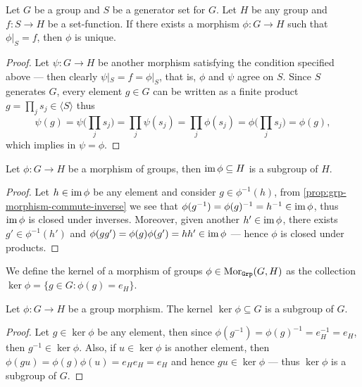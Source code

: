 \begin{proposition}
\label{prop:generator-unique-extension}
Let \(G\) be a group and \(S\) be a generator set for \(G\). Let \(H\) be any
group and \(f: S \to H\) be a set-function. If there exists a morphism \(\phi: G
\to H\) such that \(\phi|_S = f\), then \(\phi\) is unique.
\end{proposition}

\begin{proof}
Let \(\psi: G \to H\) be another morphism satisfying the condition specified
above --- then clearly \(\psi|_S = f = \phi|_{S}\), that is, \(\phi\) and
\(\psi\) agree on \(S\). Since \(S\) generates \(G\), every element \(g \in G\)
can be written as a finite product \(g = \prod_{j} s_j \in \langle S \rangle\)
thus
\[
  \psi(g) = \psi\Big( \prod_j s_j \Big)
  = \prod_j \psi(s_j) = \prod_j \phi(s_j)
  = \phi\Big( \prod_j s_j \Big) = \phi(g),
\]
which implies in \(\psi = \phi\).
\end{proof}

\begin{proposition}
\label{prop:morphism-image-subgroup}
Let \(\phi: G \to H\) be a morphism of groups, then \(\operatorname{im} \phi \subseteq H\) is
a subgroup of \(H\).
\end{proposition}

\begin{proof}
Let \(h \in \operatorname{im} \phi\) be any element and consider \(g \in \phi^{-1}(h)\), from
\cref{prop:grp-morphism-commute-inverse} we see that \(\phi(g^{-1}) =
\phi(g)^{-1} = h^{-1} \in \operatorname{im} \phi\), thus \(\operatorname{im} \phi\) is closed under
inverses. Moreover, given another \(h' \in \operatorname{im} \phi\), there exists \(g' \in
\phi^{-1}(h')\) and \(\phi(g g') = \phi(g) \phi(g') = h h' \in \operatorname{im} \phi\) ---
hence \(\phi\) is closed under products.
\end{proof}

\begin{definition}[Kernel]
We define the kernel of a morphism of groups \(\phi \in \operatorname{Mor}_{\texttt{Grp}}(G, H)\) as
the collection \(\ker \phi = \{g \in G \colon \phi(g) = e_H\}\).
\end{definition}

\begin{lemma}
\label{lem:kernel-subgroup}
Let \(\phi: G \to H\) be a group morphism. The kernel \(\ker \phi \subseteq G\)
is a subgroup of \(G\).
\end{lemma}

\begin{proof}
Let \(g \in \ker \phi\) be any element, then since \(\phi(g^{-1}) = \phi(g)^{-1}
= e_H^{-1} = e_H\), then \(g^{-1} \in \ker \phi\). Also, if \(u \in \ker \phi\)
is another element, then \(\phi(g u) = \phi(g) \phi(u) = e_H e_H = e_H\) and
hence \(g u \in \ker \phi\) --- thus \(\ker \phi\) is a subgroup of \(G\).
\end{proof}

